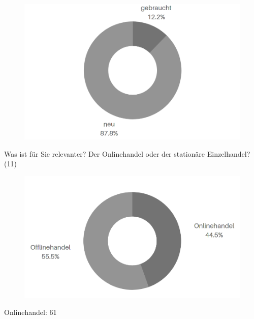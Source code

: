 \begin{figure}[H]
    \begin{center}
        \includegraphics[width=12cm]{media/schuelerumfrage/10.png}
    \end{center}
\end{figure}

\newpage\noindent Was ist für Sie relevanter? Der Onlinehandel oder der stationäre Einzelhandel? (11)\\

\begin{figure}[H]
    \begin{center}
        \includegraphics[width=12cm]{media/schuelerumfrage/11.png}
    \end{center}
\end{figure}
\iffalse
Onlinehandel: 61 

